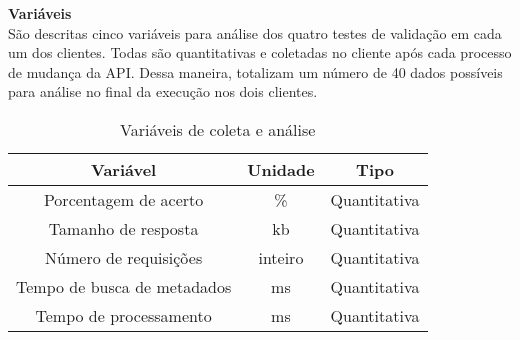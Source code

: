 \textbf{Variáveis} \\

São descritas cinco variáveis para análise dos quatro testes de validação em cada um dos clientes. Todas são quantitativas e coletadas no cliente após cada processo de mudança da API. Dessa maneira, totalizam um número de 40 dados possíveis para análise no final da execução nos dois clientes.

\begin{table}[H]
  \centering
  \begin{tabular}{|c|c|c|}
    \hline
    Variável & Unidade & Tipo \\
    \hline
    Porcentagem de acerto & \% & Quantitativa \\
    \hline
    Tamanho de resposta & kb & Quantitativa \\
    \hline
    Número de requisições & inteiro & Quantitativa \\
    \hline
    Tempo de busca de metadados & ms & Quantitativa \\
    \hline
    Tempo de processamento & ms & Quantitativa \\
    \hline
  \end{tabular}
  \caption{Variáveis de coleta e análise}
\end{table}
